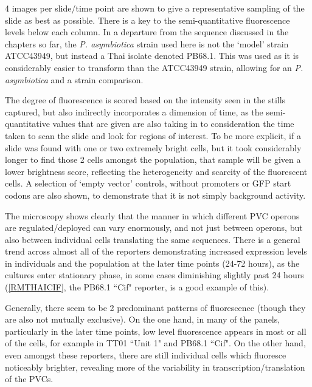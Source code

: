 4 images per slide/time point are shown to give a representative sampling of the slide as best as possible. There is a key to the semi-quantitative fluorescence levels below each column. In a departure from the sequence discussed in the chapters so far, the \emph{P. asymbiotica} strain used here is not the `model' strain ATCC43949, but instead a Thai isolate denoted PB68.1. This was used as it is considerably easier to transform than the ATCC43949 strain, allowing for an \emph{P. asymbiotica} and a \Plum{} strain comparison.

The degree of fluorescence is scored based on the intensity seen in the stills captured, but also indirectly incorporates a dimension of time, as the semi-quantitative values that are given are also taking in to consideration the time taken to scan the slide and look for regions of interest. To be more explicit, if a slide was found with one or two extremely bright cells, but it took considerably longer to find those 2 cells amongst the population, that sample will be given a lower brightness score, reflecting the heterogeneity and scarcity of the fluorescent cells. A selection of `empty vector' controls, without promoters or GFP start codons are also shown, to demonstrate that it is not simply background activity.


\clearpage

The microscopy shows clearly that the manner in which different PVC operons are regulated/deployed can vary enormously, and not just between operons, but also between individual cells translating the same sequences. There is a general trend across almost all of the reporters demonstrating increased expression levels in individuals and the population at the later time points (24-72 hours), as the cultures enter stationary phase, in some cases diminishing slightly past 24 hours (\vref{RMTHAICIF}, the PB68.1 ``Cif" reporter, is a good example of this).

Generally, there seem to be 2 predominant patterns of fluorescence (though they are also not mutually exclusive). On the one hand, in many of the panels, particularly in the later time points, low level fluorescence appears in most or all of the cells, for example in \Plum{} TT01 ``Unit 1" and \Pasy{} PB68.1 ``Cif". On the other hand, even amongst these reporters, there are still individual cells which fluoresce noticeably brighter, revealing more of the variability in transcription/translation of the PVCs.

